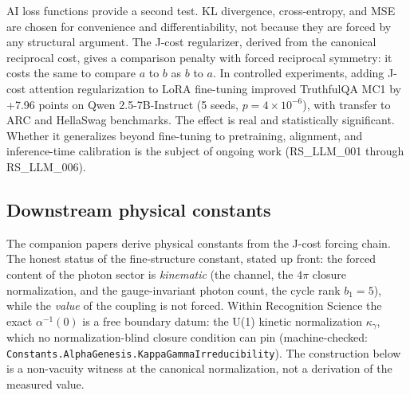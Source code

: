 \documentclass[11pt,a4paper]{article}
\theoremstyle{definition}
\theoremstyle{remark}
\begin{document}
AI loss functions provide a second test. KL divergence, cross-entropy, and MSE
are chosen for convenience and differentiability, not because they are forced
by any structural argument. The J-cost regularizer, derived from the canonical
reciprocal cost, gives a comparison penalty with forced reciprocal symmetry: it
costs the same to compare $a$ to $b$ as $b$ to $a$. In controlled experiments,
adding J-cost attention regularization to LoRA fine-tuning improved TruthfulQA
MC1 by +7.96 points on Qwen 2.5-7B-Instruct (5 seeds,
$p=4\times10^{-6}$), with transfer to ARC and HellaSwag benchmarks. The
effect is real and statistically significant. Whether it generalizes beyond
fine-tuning to pretraining, alignment, and inference-time calibration is the
subject of ongoing work (RS\_LLM\_001 through RS\_LLM\_006).

\subsection{Downstream physical constants}

The companion papers derive physical constants from the J-cost forcing
chain. The honest status of the fine-structure constant, stated up front:
the forced content of the photon sector is \emph{kinematic} (the channel,
the $4\pi$ closure normalization, and the gauge-invariant photon count,
the cycle rank $b_1 = 5$), while the \emph{value} of the coupling is not
forced. Within Recognition Science the exact $\alpha^{-1}(0)$ is a free
boundary datum: the U(1) kinetic normalization $\kappa_\gamma$, which no
normalization-blind closure condition can pin (machine-checked:
\texttt{Constants.AlphaGenesis.KappaGammaIrreducibility}). The
construction below is a non-vacuity witness at the canonical
normalization, not a derivation of the measured value.
\end{document}
